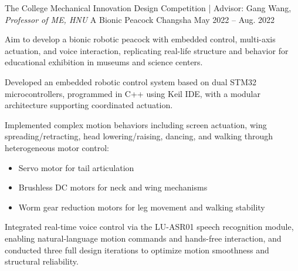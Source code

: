 \begin{cventries}
    \cventry
      {The College Mechanical Innovation Design Competition | Advisor: Gang Wang, \textit{Professor of ME, HNU}} %
      {A Bionic Peacock} %
      {Changsha} %
      {May 2022 -- Aug. 2022} %
      {
        Aim to develop a bionic robotic peacock with embedded control, multi-axis actuation, and voice interaction, replicating real-life structure and behavior for educational exhibition in museums and science centers.
        \vspace{4.5mm}
        \begin{cvitems} %
          \item{Developed an embedded robotic control system based on dual STM32 microcontrollers, programmed in C++ using Keil IDE, with a modular architecture supporting coordinated actuation.}
          \item{Implemented complex motion behaviors including screen actuation, wing spreading/retracting, head lowering/raising, dancing, and walking through heterogeneous motor control:
          \begin{itemize}
            \item Servo motor for tail articulation
            \item Brushless DC motors for neck and wing mechanisms
            \item Worm gear reduction motors for leg movement and walking stability
          \end{itemize}}
          \item{Integrated real-time voice control via the LU-ASR01 speech recognition module, enabling natural-language motion commands and hands-free interaction, and conducted three full design iterations to optimize motion smoothness and structural reliability.}
		      \end{cvitems}
      }    

  
    
\end{cventries}
